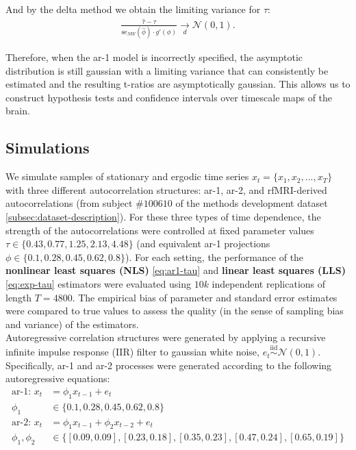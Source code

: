 \documentclass[main.tex]{subfiles}
\begin{document}
And by the delta method we obtain the limiting variance for $\tau$:
\begin{align*}
    \frac{\hat{\tau} - \tau}{\text{se}_{NW}(\hat{\phi}) \cdot g'(\phi)} \underset{d}{\to} \mathcal{N}(0,1).
\end{align*}

Therefore, when the ar-1 model is incorrectly specified, the asymptotic distribution is still gaussian with a limiting variance that can consistently be estimated and the resulting t-ratios are asymptotically gaussian. This allows us to construct hypothesis tests and confidence intervals over timescale maps of the brain.

\subsection{Simulations}\label{subsec:simulations}
 
We simulate samples of stationary and ergodic time series $x_t = \{x_1, x_2, ..., x_T\}$ with three different autocorrelation structures: ar-1, ar-2, and rfMRI-derived autocorrelations (from subject $\#100610$ of the methods development dataset \ref{subsec:dataset-description}). For these three types of time dependence, the strength of the autocorrelations were controlled at fixed parameter values $\tau \in \{0.43, 0.77, 1.25, 2.13, 4.48\}$ (and equivalent ar-1 projections $\phi \in \{0.1, 0.28, 0.45, 0.62, 0.8\}$). For each setting, the performance of the \textbf{nonlinear least squares (NLS)} \eqref{eq:ar1-tau} and \textbf{linear least squares (LLS)} \eqref{eq:exp-tau} estimators were evaluated using $10k$ independent replications of length $T=4800$. The empirical bias of parameter and standard error estimates were compared to true values to assess the quality (in the sense of sampling bias and variance) of the estimators. \\


Autoregressive correlation structures were generated by applying a recursive infinite impulse response (IIR) filter to gaussian white noise, $e_t \overset{\text{iid}}{\sim} \mathcal{N}(0, 1)$. Specifically, ar-1 and ar-2 processes were generated according to the following autoregressive equations:
\begin{align*}
    \text{ar-1: }x_t &= \phi_1 x_{t-1} + e_t\\ 
    \phi_1 &\in \{0.1, 0.28, 0.45, 0.62, 0.8\}\\
    \text{ar-2: }x_t &= \phi_1 x_{t-1} + \phi_2 x_{t-2} + e_t\\
    \phi_1, \phi_2 &\in \{[0.09, 0.09], [0.23, 0.18], [0.35, 0.23], [0.47, 0.24], [0.65, 0.19]\}
\end{align*}
\end{document}
